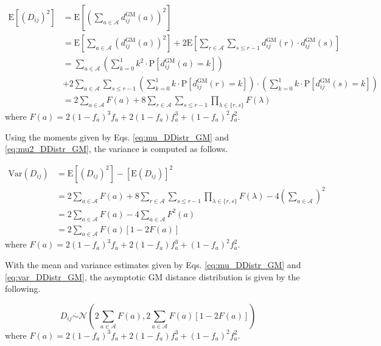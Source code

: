 \documentclass[10pt,letterpaper]{article}\usepackage[]{graphicx}\usepackage[]{color}
\begin{document}
\begin{equation}\label{eq:mu2_DDistr_GM}
\begin{aligned}
\text{E}\left[\left(D_{ij}\right)^2\right] &= \text{E}\left[\left(\sum_{a \in \mathcal{A}} d^\text{GM}_{ij}(a)\right)^2\right] \\
&= \text{E}\left[\sum_{a \in \mathcal{A}} \left(d^\text{GM}_{ij}(a)\right)^2\right] + 2 \text{E}\left[\sum_{r \in \mathcal{A}} \sum_{s \leq r - 1} d^\text{GM}_{ij}(r) \cdot d^\text{GM}_{ij}(s)\right] \\
&= \sum_{a \in \mathcal{A}} \left(\sum_{k = 0}^{1} k^2 \cdot \text{P}\left[d^\text{GM}_{ij}(a) = k\right]\right) \\
&+ 2\sum_{a \in \mathcal{A}} \sum_{s \leq r - 1} \left(\sum_{k = 0}^{1} k \cdot \text{P}\left[d^\text{GM}_{ij}(r) = k\right]\right) \cdot \left(\sum_{k = 0}^{1} k \cdot \text{P}\left[d^\text{GM}_{ij}(s) = k\right]\right) \\
&= 2\sum_{a \in \mathcal{A}} F(a) + 8 \sum_{r \in \mathcal{A}} \sum_{s \leq r - 1} \prod_{\lambda \in \{r,s\}} F(\lambda)
\end{aligned}
\end{equation}
where $F(a) = 2(1 - f_a)^3f_a + 2(1 - f_a)f^3_a + (1 - f_a)^2f^2_a$.

Using the moments given by Eqs. \ref{eq:mu_DDistr_GM} and \ref{eq:mu2_DDistr_GM}, the variance is computed as follows.

\begin{equation}\label{eq:var_DDistr_GM}
\begin{aligned}
\text{Var}(D_{ij}) &= \text{E}\left[(D_{ij})^2\right] - \left[\text{E}(D_{ij})\right]^2 \\
&= 2\sum_{a \in \mathcal{A}} F(a) + 8\sum_{r \in \mathcal{A}} \sum_{s \leq r - 1} \prod_{\lambda \in \{r,s\}} F(\lambda) - 4\left(\sum_{a \in \mathcal{A}}\right)^2 \\
&= 2\sum_{a \in \mathcal{A}} F(a) - 4\sum_{a \in \mathcal{A}}F^2(a) \\
&= 2\sum_{a \in \mathcal{A}} F(a)[1 - 2F(a)]
\end{aligned}
\end{equation}
where $F(a) = 2(1 - f_a)^3f_a + 2(1 - f_a)f^3_a + (1 - f_a)^2f^2_a$. 

With the mean and variance estimates given by Eqs. \ref{eq:mu_DDistr_GM} and \ref{eq:var_DDistr_GM}, the asymptotic GM distance distribution is given by the following.

\begin{equation}\label{eq:DDistr_GM}
D_{ij} \overset{.}{\sim} \mathcal{N}\left(2\sum_{a \in \mathcal{A}} F(a), 2\sum_{a \in \mathcal{A}} F(a)[1 - 2F(a)]\right)
\end{equation}
where $F(a) = 2(1 - f_a)^3f_a + 2(1 - f_a)f^3_a + (1 - f_a)^2f^2_a$. 
\end{document}
